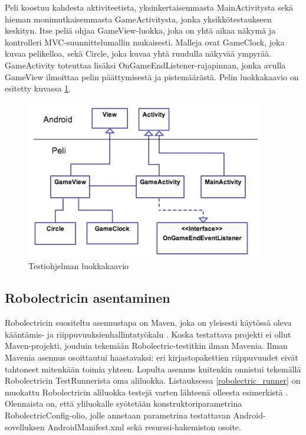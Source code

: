 Peli koostuu kahdesta aktiviteetista, yksinkertaisemmasta MainActivitysta sekä hieman monimutkaisemmasta GameActivitysta, jonka yksikkötestaukseen keskityn. Itse peliä ohjaa GameView-luokka, joka on yhtä aikaa näkymä ja kontrolleri MVC-suunnittelumallin mukaisesti. Malleja ovat GameClock, joka kuvaa pelikelloa, sekä Circle, joka kuvaa yhtä ruudulla näkyvää ympyrää. GameActivity toteuttaa lisäksi OnGameEndListener-rajapinnan, jonka avulla GameView ilmoittaa pelin päättymisestä ja pistemäärästä. Pelin luokkakaavio on esitetty kuvassa \ref{game_classdiagram}.

\begin{figure}[htb]
\includegraphics[width=105mm]{peli_luokkakaavio.png}
\caption{Testiohjelman luokkakaavio} \label{game_classdiagram}
\end{figure}

\subsection{Robolectricin asentaminen}
\label{robolectric_install}

Robolectricin suositeltu asennustapa on Maven, joka on yleisesti käytössä oleva kääntämis- ja riippuvuuksienhallintatyökalu \cite{maven}. Koska testattava projekti ei ollut Maven-projekti, jouduin tekemään Robolectric-testitkin ilman Mavenia. Ilman Mavenia asennus osoittautui haastavaksi: eri kirjastopakettien riippuvuudet eivät tahtoneet mitenkään toimia yhteen. Lopulta asennus kuitenkin onnistui tekemällä Robolectricin TestRunnerista oma aliluokka. Listauksessa \ref{robolectric_runner} on muokattu Robolectricin aliluokka testejä varten lähteenä olleesta esimerkistä \cite{sample_runner}. Olennaista on, että yliluokalle syötetään konstruktoriparametrina RobolectricConfig-olio, jolle annetaan parametrina testattavan Android-sovelluksen AndroidManifest.xml sekä resurssi-hakemiston osoite.

